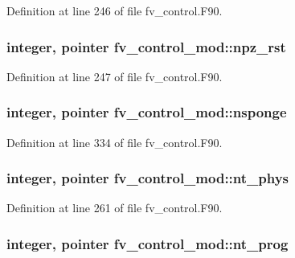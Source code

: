 Definition at line 246 of file fv\-\_\-control.\-F90.

\subsubsection[{npz\-\_\-rst}]{\setlength{\rightskip}{0pt plus 5cm}integer, pointer fv\-\_\-control\-\_\-mod\-::npz\-\_\-rst\hspace{0.3cm}{\ttfamily [private]}}\label{classfv__control__mod_ad5083ad3c6d1a221b76b47973646c078}


Definition at line 247 of file fv\-\_\-control.\-F90.

\subsubsection[{nsponge}]{\setlength{\rightskip}{0pt plus 5cm}integer, pointer fv\-\_\-control\-\_\-mod\-::nsponge\hspace{0.3cm}{\ttfamily [private]}}\label{classfv__control__mod_ad64bda37c9167de57eb5c08e1cd21588}


Definition at line 334 of file fv\-\_\-control.\-F90.

\subsubsection[{nt\-\_\-phys}]{\setlength{\rightskip}{0pt plus 5cm}integer, pointer fv\-\_\-control\-\_\-mod\-::nt\-\_\-phys\hspace{0.3cm}{\ttfamily [private]}}\label{classfv__control__mod_a7cdc994b0e188655a7c21504db5e1731}


Definition at line 261 of file fv\-\_\-control.\-F90.

\subsubsection[{nt\-\_\-prog}]{\setlength{\rightskip}{0pt plus 5cm}integer, pointer fv\-\_\-control\-\_\-mod\-::nt\-\_\-prog\hspace{0.3cm}{\ttfamily [private]}}\label{classfv__control__mod_a41418fcc74203cd7a8a201edb78c1956}


